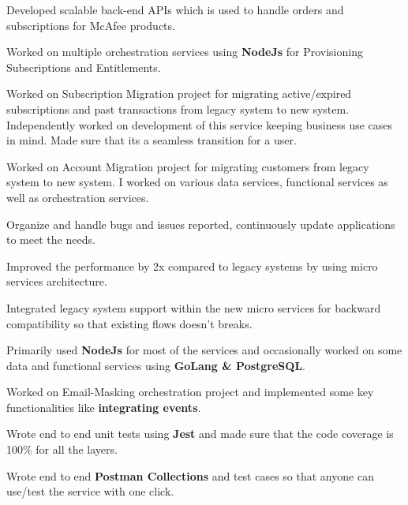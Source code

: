 \documentclass[letterpaper]{deedy-resume} %
\begin{document}
\begin{minipage}[t]{0.66\textwidth}
\vspace{\topsep} %
\begin{tightitemize}
\item Developed scalable back-end APIs which is used to handle orders and subscriptions for McAfee products.  
\item Worked on multiple orchestration services using \textbf{NodeJs} for Provisioning Subscriptions and Entitlements.
\item Worked on Subscription Migration project for migrating active/expired subscriptions and past transactions from legacy system to new system. Independently worked on development of this service keeping business use cases in mind. Made sure that its a seamless transition for a user.
\item Worked on Account Migration project for migrating customers from legacy system to new system. I worked on various data services, functional services as well as orchestration services.
\item Organize and handle bugs and issues reported, continuously update applications to meet the needs.
\item Improved the performance by 2x compared to legacy systems by using micro services architecture.
\item Integrated legacy system support within the new micro services for backward compatibility so that existing flows doesn't breaks.
\item Primarily used \textbf{NodeJs} for most of the services and occasionally worked on some data and functional services using \textbf{GoLang \& PostgreSQL}.
\end{tightitemize}

\sectionspace %
\sectionspace

\begin{tightitemize}
\item Worked on Email-Masking orchestration project and implemented some key functionalities like \textbf{integrating events}.
\item Wrote end to end unit tests using \textbf{Jest} and made sure that the code coverage is 100\% for all the layers.
\item Wrote end to end \textbf{Postman Collections} and test cases so that anyone can use/test the service with one click.


\end{tightitemize}
\end{minipage}
\end{document}
